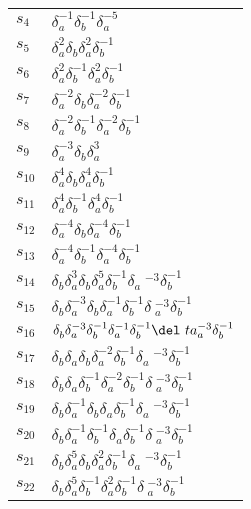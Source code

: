 \documentclass{article}
\begin{document}
\begin{center}
\begin{tabular}{ll}
$s_{4}$ & $\delta_a^{-1}\delta_b^{-1}\delta_a^{-5}$ \\
$s_{5}$ & $\delta_a^{2}\delta_b^{}\delta_a^{2}\delta_b^{-1}$ \\
$s_{6}$ & $\delta_a^{2}\delta_b^{-1}\delta_a^{2}\delta_b^{-1}$ \\
$s_{7}$ & $\delta_a^{-2}\delta_b^{}\delta_a^{-2}\delta_b^{-1}$ \\
$s_{8}$ & $\delta_a^{-2}\delta_b^{-1}\delta_a^{-2}\delta_b^{-1}$ \\
$s_{9}$ & $\delta_a^{-3}\delta_b^{}\delta_a^{3}$ \\
$s_{10}$ & $\delta_a^{4}\delta_b^{}\delta_a^{4}\delta_b^{-1}$ \\
$s_{11}$ & $\delta_a^{4}\delta_b^{-1}\delta_a^{4}\delta_b^{-1}$ \\
$s_{12}$ & $\delta_a^{-4}\delta_b^{}\delta_a^{-4}\delta_b^{-1}$ \\
$s_{13}$ & $\delta_a^{-4}\delta_b^{-1}\delta_a^{-4}\delta_b^{-1}$ \\
$s_{14}$ & $\delta_b^{}\delta_a^{3}\delta_b^{}\delta_a^{5}\delta_b^{-1}\delta_a\
^{-3}\delta_b^{-1}$ \\
$s_{15}$ & $\delta_b^{}\delta_a^{-3}\delta_b^{}\delta_a^{-1}\delta_b^{-1}\delta\
_a^{-3}\delta_b^{-1}$ \\
$s_{16}$ & $\delta_b^{}\delta_a^{-3}\delta_b^{-1}\delta_a^{-1}\delta_b^{-1}\del\
ta_a^{-3}\delta_b^{-1}$ \\
$s_{17}$ & $\delta_b^{}\delta_a^{}\delta_b^{}\delta_a^{-2}\delta_b^{-1}\delta_a\
^{-3}\delta_b^{-1}$ \\
$s_{18}$ & $\delta_b^{}\delta_a^{}\delta_b^{-1}\delta_a^{-2}\delta_b^{-1}\delta\
_a^{-3}\delta_b^{-1}$ \\
$s_{19}$ & $\delta_b^{}\delta_a^{-1}\delta_b^{}\delta_a^{}\delta_b^{-1}\delta_a\
^{-3}\delta_b^{-1}$ \\
$s_{20}$ & $\delta_b^{}\delta_a^{-1}\delta_b^{-1}\delta_a^{}\delta_b^{-1}\delta\
_a^{-3}\delta_b^{-1}$ \\
$s_{21}$ & $\delta_b^{}\delta_a^{5}\delta_b^{}\delta_a^{2}\delta_b^{-1}\delta_a\
^{-3}\delta_b^{-1}$ \\
$s_{22}$ & $\delta_b^{}\delta_a^{5}\delta_b^{-1}\delta_a^{2}\delta_b^{-1}\delta\
_a^{-3}\delta_b^{-1}$ \\
\bottomrule
\end{tabular}
\end{center}

\thispagestyle{empty}
\end{document}

